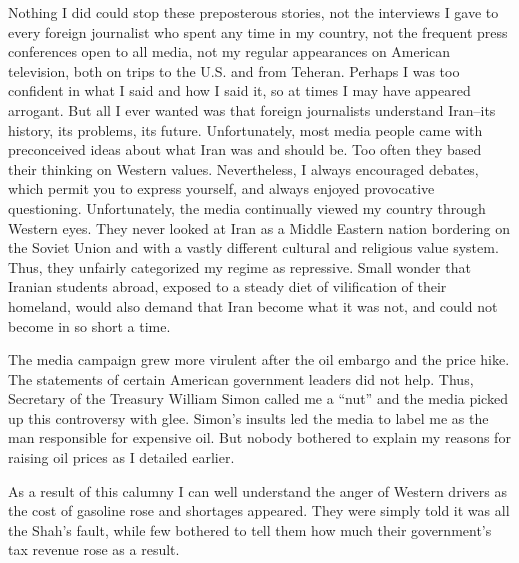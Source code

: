 Nothing I did could stop these preposterous stories, not the interviews I gave to every foreign journalist who spent any time in my country, not the frequent press conferences open to all media, not my regular appearances on American television, both on trips to the U.S. and from Teheran. Perhaps I was too confident in what I said and how I said it, so at times I may have appeared arrogant. But all I ever wanted was that foreign journalists understand Iran--its history, its problems, its future. Unfortunately, most media people came with preconceived ideas about what Iran was and should be. Too often they based their thinking on Western values. Nevertheless, I always encouraged debates, which permit you to express yourself, and always enjoyed provocative questioning. Unfortunately, the media continually viewed my country through Western eyes. They never looked at Iran as a Middle Eastern nation bordering on the Soviet Union and with a vastly different cultural and religious value system. Thus, they unfairly categorized my regime as repressive. Small wonder that Iranian students abroad, exposed to a steady diet of vilification of their homeland, would also demand that Iran become what it was not, and could not become in so short a time. 

The media campaign grew more virulent after the oil embargo and the price hike. The statements of certain American government leaders did not help. Thus, Secretary of the Treasury William Simon called me a “nut” and the media picked up this controversy with glee. Simon's insults led the media to label me as the man responsible for expensive oil. But nobody bothered to explain my reasons for raising oil prices as I detailed earlier. 

As a result of this calumny I can well understand the anger of Western drivers as the cost of gasoline rose and shortages appeared. They were simply told it was all the Shah's fault, while few bothered to tell them how much their government's tax revenue rose as a result. 

